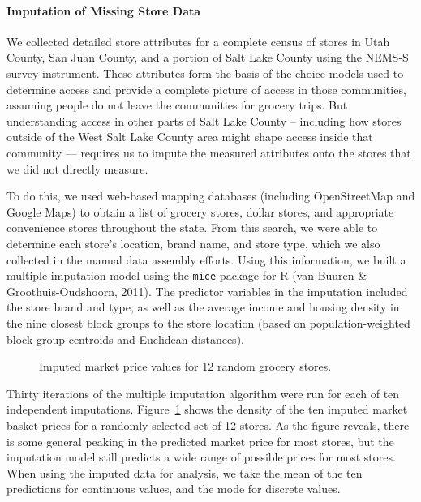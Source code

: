 \documentclass[
  letterpaper,
  number,
  review,
  doubleblind,
  3p]{elsarticle}
\let\oldparagraph\paragraph
\renewcommand{\paragraph}[1]{\oldparagraph{#1}\mbox{}}
\begin{document}
\paragraph{Imputation of Missing Store
Data}\label{imputation-of-missing-store-data}

We collected detailed store attributes for a complete census of stores
in Utah County, San Juan County, and a portion of Salt Lake County using
the NEMS-S survey instrument. These attributes form the basis of the
choice models used to determine access and provide a complete picture of
access in those communities, assuming people do not leave the
communities for grocery trips. But understanding access in other parts
of Salt Lake County -- including how stores outside of the West Salt
Lake County area might shape access inside that community --- requires
us to impute the measured attributes onto the stores that we did not
directly measure.

To do this, we used web-based mapping databases (including OpenStreetMap
and Google Maps) to obtain a list of grocery stores, dollar stores, and
appropriate convenience stores throughout the state. From this search,
we were able to determine each store's location, brand name, and store
type, which we also collected in the manual data assembly efforts. Using
this information, we built a multiple imputation model using the
\texttt{mice} package for R (van Buuren \& Groothuis-Oudshoorn, 2011).
The predictor variables in the imputation included the store brand and
type, as well as the average income and housing density in the nine
closest block groups to the store location (based on population-weighted
block group centroids and Euclidean distances).

\begin{figure}


\caption{\label{fig-marketimp}Imputed market price values for 12 random
grocery stores.}

\end{figure}%

Thirty iterations of the multiple imputation algorithm were run for each
of ten independent imputations. Figure~\ref{fig-marketimp} shows the
density of the ten imputed market basket prices for a randomly selected
set of 12 stores. As the figure reveals, there is some general peaking
in the predicted market price for most stores, but the imputation model
still predicts a wide range of possible prices for most stores. When
using the imputed data for analysis, we take the mean of the ten
predictions for continuous values, and the mode for discrete values.
\end{document}
